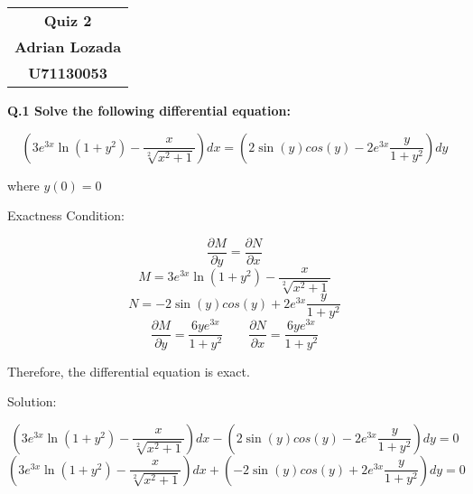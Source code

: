 \documentclass{article}
\renewcommand{\maketitle}{
    \begin{center}
        \begin{tabular}{c}
            \textbf{Quiz 2} \\
            \textbf{Adrian Lozada} \\
            \textbf{U71130053} \\
        \end{tabular}
    \end{center}
}
\begin{document}
    \maketitle
    
    \newpage
    \begin{flushleft}
        \textbf{Q.1 Solve the following differential equation:}
    \end{flushleft}
    \begin{center}
        \begin{equation}
            \left( 3e^{3x}\ln{(1+y^{2})}-\frac{x}{\sqrt[2]{x^{2}+1}} \right)dx 
            =
            \left(2\sin{(y)}cos{(y)}-2e^{3x}\frac{y}{1+y^{2}}\right)dy
        \end{equation}
    \end{center}
    \begin{flushleft}
        where $y(0)=0$
    \end{flushleft}
    \begin{flushleft}
        Exactness Condition:
    \end{flushleft}
    \begin{equation}
        \frac{\partial M}{\partial y} = \frac{\partial N}{\partial x}
    \end{equation}
    \begin{equation}
        M = 3e^{3x}\ln{(1+y^{2})}-\frac{x}{\sqrt[2]{x^{2}+1}}
    \end{equation}
    \begin{equation}
        N = -2\sin{(y)}cos{(y)}+2e^{3x}\frac{y}{1+y^{2}}
    \end{equation}
    \begin{equation}
        \frac{\partial M}{\partial y} = \frac{6ye^{3x}}{1+y^{2}}
        \qquad
        \frac{\partial N}{\partial x} = \frac{6ye^{3x}}{1+y^{2}}
    \end{equation}
    \begin{flushleft}
        Therefore, the differential equation is exact.
    \end{flushleft}
    \begin{flushleft}
        Solution:
    \end{flushleft}
    \begin{equation}
        \left( 3e^{3x}\ln{(1+y^{2})}-\frac{x}{\sqrt[2]{x^{2}+1}} \right)dx 
        -
        \left(2\sin{(y)}cos{(y)}-2e^{3x}\frac{y}{1+y^{2}}\right)dy = 0
    \end{equation}
    \begin{equation}
        \left( 3e^{3x}\ln{(1+y^{2})}-\frac{x}{\sqrt[2]{x^{2}+1}} \right)dx 
        +
        \left(-2\sin{(y)}cos{(y)}+2e^{3x}\frac{y}{1+y^{2}}\right)dy = 0
    \end{equation}
\end{document}
